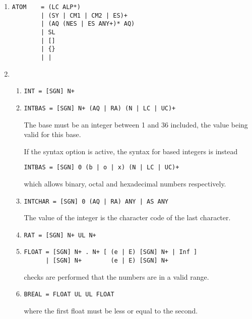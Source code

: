 \begin{enumerate}
\item {}
\begin{verbatim}
ATOM    = (LC ALP*)
        | (SY | CM1 | CM2 | ES)+
        | (AQ (NES | ES ANY+)* AQ)
        | SL
        | []
        | {}
        | |
\end{verbatim}

\item{}

\begin{enumerate}

\item{}
\begin{verbatim}
INT = [SGN] N+
\end{verbatim}

\item{}
\begin{verbatim}
INTBAS = [SGN] N+ (AQ | RA) (N | LC | UC)+
\end{verbatim}
The base must be an integer between 1 and 36 included, the value
being valid for this base.

If the syntax option  is active, the syntax for
based
integers is instead
\begin{verbatim}
INTBAS = [SGN] 0 (b | o | x) (N | LC | UC)+
\end{verbatim}
which allows binary, octal and hexadecimal numbers respectively.

\item{}
\begin{verbatim}
INTCHAR = [SGN] 0 (AQ | RA) ANY | AS ANY
\end{verbatim}
The value of the integer is the character code of the last character.

\item{}
\begin{verbatim}
RAT = [SGN] N+ UL N+
\end{verbatim}

\item{}
\begin{verbatim}
FLOAT = [SGN] N+ . N+ [ (e | E) [SGN] N+ | Inf ]
      | [SGN] N+        (e | E) [SGN] N+
\end{verbatim}
checks are performed that the numbers are in a valid range.

\item{}
\begin{verbatim}
BREAL = FLOAT UL UL FLOAT
\end{verbatim}
where the first float must be less or equal to the second.


\end{enumerate}
\end{enumerate}
